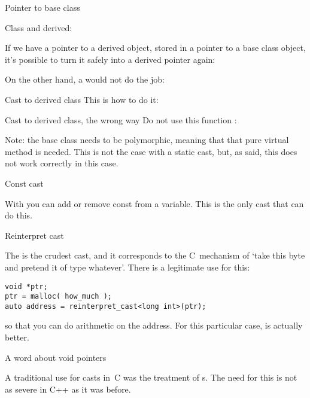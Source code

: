 \begin{slide}{Pointer to base class}
  \label{sl:dyn-base-ptr}

  Class and derived:
\end{slide}

If we have a pointer to a derived object, stored in a pointer to a
base class object, it's possible to turn it safely into a derived
pointer again:
%

On the other hand, a  would not do the job:
%

\begin{slide}{Cast to derived class}
  \label{sl:dyn-cast}
  This is how to do it:
\end{slide}

\begin{slide}{Cast to derived class, the wrong way}
  \label{sl:dyn-cast-wrong}
  Do not use this function :
\end{slide}

Note: the base class needs to be polymorphic, meaning that that pure
virtual method is needed. This is not the case with a static cast,
but, as said, this does not work correctly in this case.

 {Const cast}

With  you can add or remove const from a
variable. This is the only cast that can do this.

 {Reinterpret cast}

The  is the crudest cast, and it
corresponds to the C~mechanism of `take this byte and pretend it of
type whatever'. There is a legitimate use for this:
\begin{lstlisting}
void *ptr;
ptr = malloc( how_much );
auto address = reinterpret_cast<long int>(ptr);
\end{lstlisting}
so that you can do arithmetic on the address. For this particular
case,  is actually better.

 {A word about void pointers}

A traditional use for casts in~C was the treatment of
s. The need for this is not as severe in
C++ as it was before.

